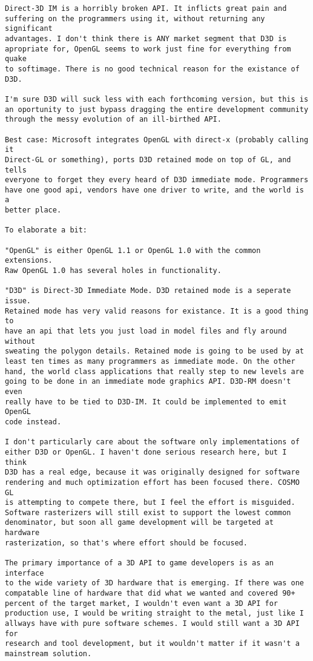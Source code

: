 \begin{verbatim}
Direct-3D IM is a horribly broken API. It inflicts great pain and 
suffering on the programmers using it, without returning any significant 
advantages. I don't think there is ANY market segment that D3D is 
apropriate for, OpenGL seems to work just fine for everything from quake 
to softimage. There is no good technical reason for the existance of D3D. 

I'm sure D3D will suck less with each forthcoming version, but this is 
an oportunity to just bypass dragging the entire development community 
through the messy evolution of an ill-birthed API. 

Best case: Microsoft integrates OpenGL with direct-x (probably calling it
Direct-GL or something), ports D3D retained mode on top of GL, and tells 
everyone to forget they every heard of D3D immediate mode. Programmers 
have one good api, vendors have one driver to write, and the world is a 
better place. 

To elaborate a bit: 

"OpenGL" is either OpenGL 1.1 or OpenGL 1.0 with the common extensions. 
Raw OpenGL 1.0 has several holes in functionality. 

"D3D" is Direct-3D Immediate Mode. D3D retained mode is a seperate issue. 
Retained mode has very valid reasons for existance. It is a good thing to 
have an api that lets you just load in model files and fly around without 
sweating the polygon details. Retained mode is going to be used by at 
least ten times as many programmers as immediate mode. On the other 
hand, the world class applications that really step to new levels are 
going to be done in an immediate mode graphics API. D3D-RM doesn't even
really have to be tied to D3D-IM. It could be implemented to emit OpenGL 
code instead. 

I don't particularly care about the software only implementations of 
either D3D or OpenGL. I haven't done serious research here, but I think 
D3D has a real edge, because it was originally designed for software 
rendering and much optimization effort has been focused there. COSMO GL
is attempting to compete there, but I feel the effort is misguided. 
Software rasterizers will still exist to support the lowest common 
denominator, but soon all game development will be targeted at hardware 
rasterization, so that's where effort should be focused. 

The primary importance of a 3D API to game developers is as an interface
to the wide variety of 3D hardware that is emerging. If there was one 
compatable line of hardware that did what we wanted and covered 90+ 
percent of the target market, I wouldn't even want a 3D API for 
production use, I would be writing straight to the metal, just like I 
allways have with pure software schemes. I would still want a 3D API for
research and tool development, but it wouldn't matter if it wasn't a 
mainstream solution. 


\end{verbatim}
